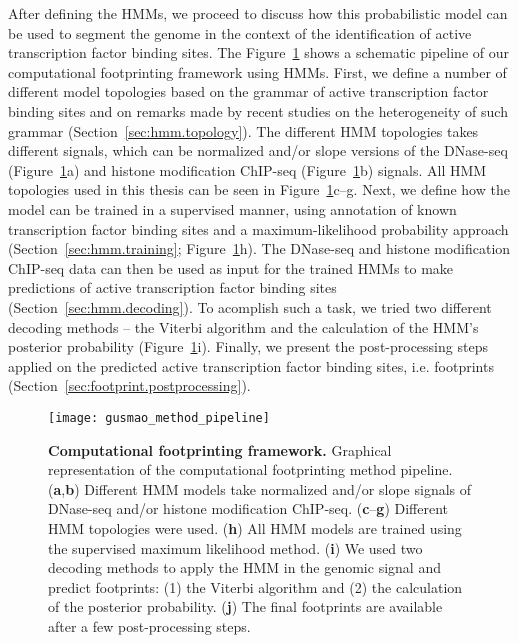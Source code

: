 After defining the HMMs, we proceed to discuss how this probabilistic model can be used to segment the genome in the context of the identification of active transcription factor binding sites. The Figure~\ref{fig:gusmao_method_pipeline} shows a schematic pipeline of our computational footprinting framework using HMMs. First, we define a number of different model topologies based on the grammar of active transcription factor binding sites and on remarks made by recent studies on the heterogeneity of such grammar (Section~\ref{sec:hmm.topology}). The different HMM topologies takes different signals, which can be normalized and/or slope versions of the DNase-seq (Figure~\ref{fig:gusmao_method_pipeline}a) and histone modification ChIP-seq (Figure~\ref{fig:gusmao_method_pipeline}b) signals. All HMM topologies used in this thesis can be seen in Figure~\ref{fig:gusmao_method_pipeline}c--g. Next, we define how the model can be trained in a supervised manner, using annotation of known transcription factor binding sites and a maximum-likelihood probability approach (Section~\ref{sec:hmm.training}; Figure~\ref{fig:gusmao_method_pipeline}h). The DNase-seq and histone modification ChIP-seq data can then be used as input for the trained HMMs to make predictions of active transcription factor binding sites (Section~\ref{sec:hmm.decoding}). To acomplish such a task, we tried two different decoding methods -- the Viterbi algorithm and the calculation of the HMM's posterior probability (Figure~\ref{fig:gusmao_method_pipeline}i). Finally, we present the post-processing steps applied on the predicted active transcription factor binding sites, i.e. footprints (Section~\ref{sec:footprint.postprocessing}).

\begin{figure}[h!]
\centering
\texttt{[image: gusmao\_method\_pipeline]}
\caption[Computational footprinting framework]{\textbf{Computational footprinting framework.} Graphical representation of the computational footprinting method pipeline. (\textbf{a},\textbf{b}) Different HMM models take normalized and/or slope signals of DNase-seq and/or histone modification ChIP-seq. (\textbf{c}--\textbf{g}) Different HMM topologies were used. (\textbf{h}) All HMM models are trained using the supervised maximum likelihood method. (\textbf{i}) We used two decoding methods to apply the HMM in the genomic signal and predict footprints: (1) the Viterbi algorithm and (2) the calculation of the posterior probability. (\textbf{j}) The final footprints are available after a few post-processing steps.}
\label{fig:gusmao_method_pipeline}
\end{figure}

